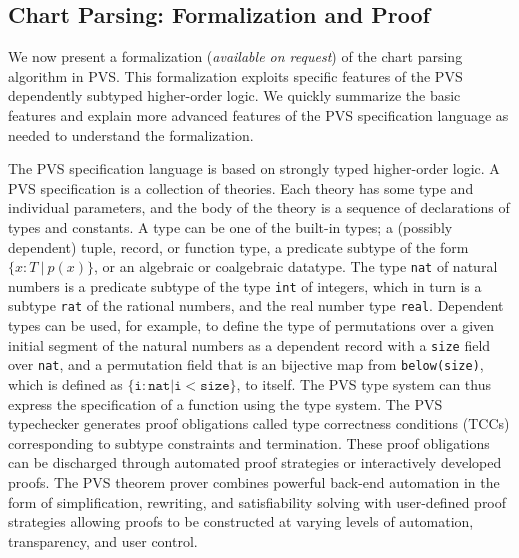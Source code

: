 \documentclass[sigplan,10pt,anonymous,review]{acmart}\settopmatter{printfolios=true,printccs=false,printacmref=false}
\newcommand{\myparagraph}[1]{}
\begin{document}
\begin{CCSXML}








\section{Chart Parsing: Formalization and Proof}\label{sec:chartparsing}


We now present a formalization (\emph{available on request})
of the chart parsing algorithm in PVS.
This formalization exploits specific features of
the PVS dependently subtyped higher-order logic.  
We quickly summarize the basic features and 
explain more advanced  features of the PVS specification language
as needed to understand the formalization.  

\myparagraph{PVS in Brief.} The PVS specification language is based on strongly typed higher-order logic.  
A PVS specification is a collection of theories.  Each theory has
some type and individual parameters, and the body of the theory is a sequence
of declarations of types and constants.  A type can be one of the built-in
types; a (possibly dependent) tuple, record, or function type, a predicate
subtype of the form $\{x: T ~|~ p(x)\}$, or an algebraic or coalgebraic datatype.
The type \texttt{nat} of natural numbers is a predicate subtype of the
type \texttt{int} of integers, which in turn is a subtype \texttt{rat} of the
rational numbers, and the real number type \texttt{real}\@.  Dependent
types can be used, for example, to define the type of permutations over a
given initial segment of the natural numbers as a dependent record with a
\texttt{size} field over \texttt{nat}, and a permutation field that is an bijective
map from \texttt{below(size)}, which is defined as $\{\mathtt{i} : \mathtt{nat} | \mathtt{i} < \mathtt{size}\}$, to itself.  The PVS type system can thus express
the specification of a function using the type system.  
 The PVS typechecker generates proof obligations called type correctness conditions (TCCs) corresponding to subtype constraints and termination.  
These proof obligations can be discharged through automated proof strategies or interactively developed proofs.  The PVS theorem prover combines powerful back-end automation in the form of simplification, rewriting, and satisfiability solving with
user-defined proof strategies allowing proofs to be constructed at varying levels of automation, transparency, and user control.




\end{CCSXML}
\end{document}

